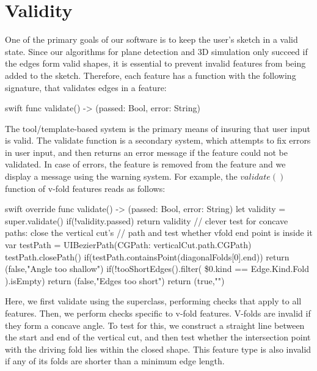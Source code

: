\section{Validity}\label{validity}

One of the primary goals of our software is to keep the user's sketch in
a valid state. Since our algorithms for plane detection and 3D
simulation only succeed if the edges form valid shapes, it is essential
to prevent invalid features from being added to the sketch. Therefore,
each feature has a function with the following signature, that validates
edges in a feature:

\begin{pygmented}{swift}
func validate() -> (passed: Bool, error: String) 
\end{pygmented}

The tool/template-based system is the primary means of insuring that
user input is valid. The validate function is a secondary system, which
attempts to fix errors in user input, and then returns an error message
if the feature could not be validated. In case of errors, the feature is
removed from the feature and we display a message using the warning
system. For example, the \(validate()\) function of v-fold features
reads as follows:

\singlespacing 

\begin{pygmented}{swift}
override func validate() -> (passed: Bool, error: String) {
 let validity = super.validate()    
 if(!validity.passed){
    return validity
 }
 // clever test for concave paths: close the vertical cut's
 // path and test whether vfold end point is inside it
 var testPath = UIBezierPath(CGPath: verticalCut.path.CGPath)
 testPath.closePath()
 if(testPath.containsPoint(diagonalFolds[0].end)){
    return (false,"Angle too shallow")
 }
 if(!tooShortEdges().filter({
    \$0.kind == Edge.Kind.Fold
    }).isEmpty){
        return (false,"Edges too short")
 }
    return (true,"")
 }
\end{pygmented}

\doublespacing

Here, we first validate using the superclass, performing checks that
apply to all features. Then, we perform checks specific to v-fold
features. V-folds are invalid if they form a concave angle. To test for
this, we construct a straight line between the start and end of the
vertical cut, and then test whether the intersection point with the
driving fold lies within the closed shape. This feature type is also
invalid if any of its folds are shorter than a minimum edge length.

